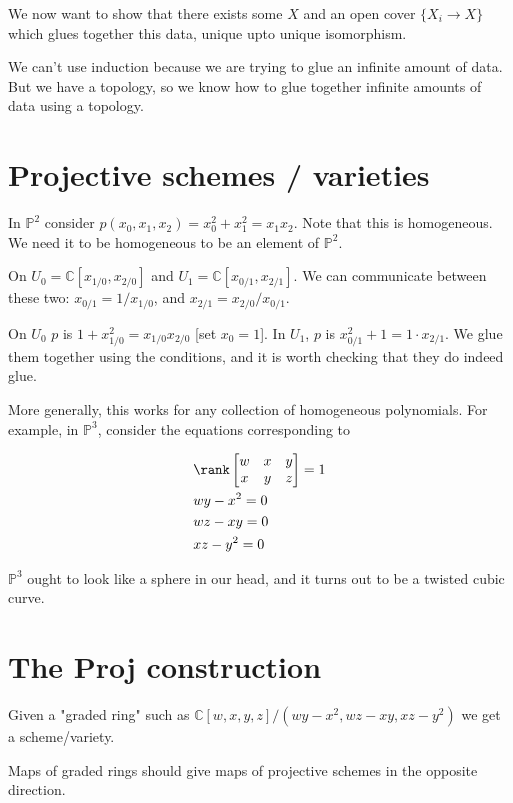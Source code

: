\documentclass{book}
\newcommand{\C}{\ensuremath{\mathbb{C}}}
\renewcommand{\P}{\ensuremath{\mathbb{P}}}
\theoremstyle{definition}
\begin{document}
We now want to show that there exists some $X$ and an open cover $\{ X_i \rightarrow X \}$
which glues together this data, unique upto unique isomorphism.

We can't use induction because we are trying to glue an infinite amount of data.
But we have a topology, so we know how to glue together infinite amounts of data
using a topology.

\section{Projective schemes / varieties}

In $\P^2$ consider $p(x_0, x_1, x_2) = x_0^2 + x_1^2 = x_1 x_2$. Note that this is homogeneous.
We need it to be homogeneous to be an element of $\P^2$.

On $U_0 = \C[x_{1/0}, x_{2/0}]$ and $U_1 = \C[x_{0/1}, x_{2/1}]$. We can communicate
between these two: $x_{0/1} = 1/x_{1/0}$, and $x_{2/1} = x_{2/0} / x_{0/1}$.

On $U_0$ $p$ is $1 + x_{1/0}^2 = x_{1/0}x_{2/0}$ [set $x_0 = 1$].
In $U_1$, $p$ is $x_{0/1}^2 + 1 = 1 \cdot x_{2/1}$. We glue them together
using the conditions, and it is worth checking that they do indeed glue.

More generally, this works for any collection of homogeneous polynomials. 
For example, in $\P^3$, consider the equations corresponding to

\begin{align*}
&\rank
\begin{bmatrix}
w & x &  y \\
x & y & z
\end{bmatrix} = 1 \\
& wy - x^2 = 0 \\
& wz - xy = 0 \\
& xz - y^2 = 0 \\
\end{align*}

$\P^3$ ought to look like a sphere in our head, and it turns out to be a
twisted cubic curve.

\section{The Proj construction}
Given a "graded ring" such as $\C[w, x, y, z]/(wy - x^2, wz - xy, xz - y^2)$
we get a scheme/variety.

Maps of graded rings should give maps of projective schemes in the opposite
direction. 
\end{document}
